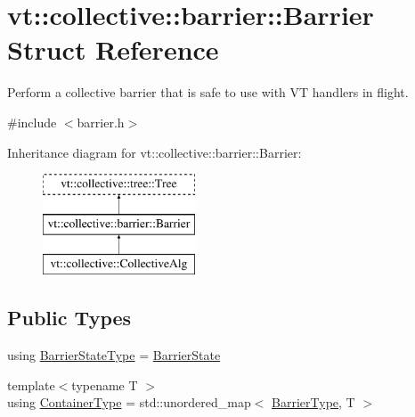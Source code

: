 \hypertarget{structvt_1_1collective_1_1barrier_1_1_barrier}{}\section{vt\+:\+:collective\+:\+:barrier\+:\+:Barrier Struct Reference}
\label{structvt_1_1collective_1_1barrier_1_1_barrier}


Perform a collective barrier that is safe to use with VT handlers in flight.  




{\ttfamily \#include $<$barrier.\+h$>$}

Inheritance diagram for vt\+:\+:collective\+:\+:barrier\+:\+:Barrier\+:\begin{figure}[H]
\begin{center}
\leavevmode
\includegraphics[height=3.000000cm]{structvt_1_1collective_1_1barrier_1_1_barrier}
\end{center}
\end{figure}
\subsection*{Public Types}
\begin{DoxyCompactItemize}
\item 
using \hyperlink{structvt_1_1collective_1_1barrier_1_1_barrier_a9b612818f7b44ca65f2caee0dee094f3}{Barrier\+State\+Type} = \hyperlink{structvt_1_1collective_1_1barrier_1_1_barrier_state}{Barrier\+State}
\item 
{\footnotesize template$<$typename T $>$ }\\using \hyperlink{structvt_1_1collective_1_1barrier_1_1_barrier_a84bfbd26a48a1c3bb7272e81245e4873}{Container\+Type} = std\+::unordered\+\_\+map$<$ \hyperlink{namespacevt_a25e481f0d6bbc7204db23d1c87a62e77}{Barrier\+Type}, T $>$
\end{DoxyCompactItemize}

